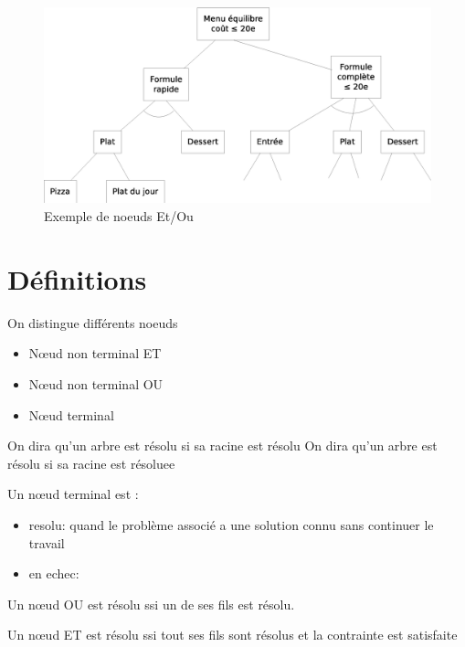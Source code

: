 \documentclass[12pt,a4paper,openany]{book}
\begin{document}
	\begin{exemple}
		\begin{figure}[H]
			\centering
			\includegraphics[width=13cm]{diag5.eps}
			\caption{Exemple de noeuds Et/Ou}
		\end{figure}
	\end{exemple}

	\section{Définitions}
	On distingue différents noeuds 
	\begin{itemize}
		\item Nœud non terminal ET
		\item Nœud non terminal OU
		\item Nœud terminal
	\end{itemize}
	On dira qu'un arbre est résolu si sa racine est résolu	On dira qu'un arbre est résolu si sa racine est résoluee

	\begin{definition}
		Un nœud terminal est :

		\begin{itemize}
			\item resolu: quand le problème associé a une solution connu sans continuer le travail
			\item en echec: 
		\end{itemize}
	\end{definition}


	\begin{definition}
		Un nœud OU est résolu ssi un de ses fils est résolu.
	\end{definition}

	\begin{definition}
		Un nœud ET est résolu ssi tout ses fils sont résolus et la contrainte est satisfaite
	\end{definition}
\end{document}
